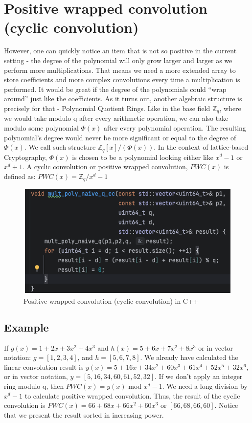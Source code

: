 \documentclass{techrep}
\theoremstyle{definition}
\theoremstyle{plain}
\newcommand{\Z}{\mathbb{Z}}
\begin{document}
\section{Positive wrapped convolution (cyclic convolution)}
However, one can quickly notice an item that is not so positive in the current setting - the degree of the polynomial will only grow larger and larger as we perform more multiplications. That means we need a more extended array to store coefficients and more complex convolutions every time a multiplication is performed. It would be great if the degree of the polynomials could “wrap around” just like the coefficients. As it turns out, another algebraic structure is precisely for that - Polynomial Quotient Rings. Like in the base field  $\Z_{q}$, where we would take modulo q after every arithmetic operation, we can also take modulo some polynomial $\Phi(x)$ after every polynomial operation. The resulting polynomial’s degree would never be more significant or equal to the degree of $\Phi(x)$. We call such structure $\Z_{q}[x]/(\Phi(x))$. In the context of lattice-based Cryptography, $\Phi(x)$ is chosen to be a polynomial looking either like $x^d - 1$ or $x^d + 1$.  A cyclic convolution or positive wrapped convolution, $PWC(x)$ is defined as: $PWC(x) = \Z_{q}/x^d - 1$


\begin{figure}[H]
 	\centering
 	\includegraphics[width=.9\columnwidth]{fig/PWC_cplus.png}
 	\caption{Positive wrapped convolution (cyclic convolution) in C++} 
\label{fig:PWC_cplus}
\end{figure}



\subsection{Example}
If $g(x) = 1 + 2x + 3x^2 + 4x^3$ and $h(x) = 5 + 6x + 7x^2 + 8x^3$ or in vector notation:  $g = [1, 2, 3, 4]$, and $h = [5, 6, 7, 8]$. We already have calculated the linear convolution result is $y(x) = 5 + 16x + 34x^2 + 60x^3 + 61x^4 + 52x^5 + 32x^6$, or in vector notation, $y = [5, 16, 34, 60, 61, 52, 32]$. If we don't apply an integer ring modulo q, then $PWC(x) = y(x)$ mod $x^d - 1$.  We need a long division by $x^d - 1$ to calculate positive wrapped convolution. Thus, the result of the cyclic convolution is $PWC(x) = 66 + 68x + 66x^2 + 60x^3$ or $[66, 68, 66, 60]$. Notice that we present the result sorted in increasing power.
\end{document}
